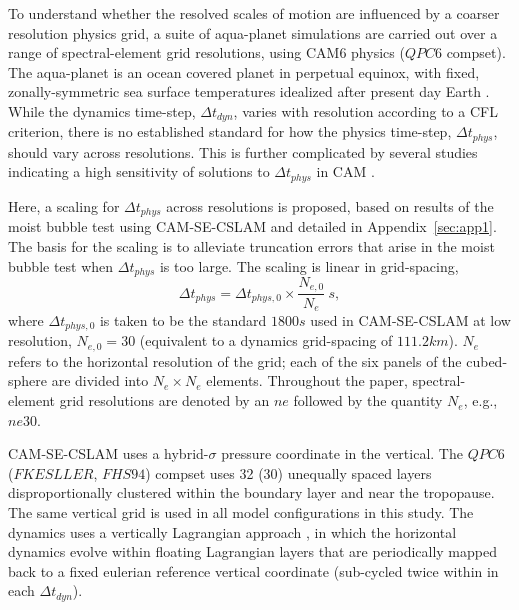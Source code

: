 \documentclass[draft,linenumbers]{agujournal}
\begin{document}
To understand whether the resolved scales of motion are influenced by a coarser resolution physics grid, a suite of aqua-planet simulations \citep{NH2000ASL,MWO2016JAMES} are carried out over a range of spectral-element grid resolutions, using CAM6 physics ($QPC6$ compset). The aqua-planet is an ocean covered planet in perpetual equinox, with fixed, zonally-symmetric sea surface temperatures idealized after present day Earth \citep[$QOBS$ in][]{NH2000ASL}. While the dynamics time-step, $\Delta t_{dyn}$, varies with resolution according to a CFL criterion, there is no established standard for how the physics time-step, $\Delta t_{phys}$, should vary across resolutions. This is further complicated by several studies indicating a high sensitivity of solutions to $\Delta t_{phys}$ in CAM  \citep{WO2003QJR,W2013QJRMS,WETAL2015JAMES,HR2018JAMES}.

Here, a scaling for $\Delta t_{phys}$ across resolutions is proposed, based on results of the moist bubble test \citep{HR2018JAMES} using CAM-SE-CSLAM and detailed in Appendix~\ref{sec:app1}. The basis for the scaling is to alleviate truncation errors that arise in the moist bubble test when $\Delta t_{phys}$ is too large. The scaling is linear in grid-spacing,
\begin{equation}
\Delta t_{phys} = \Delta t_{phys,0} \times \frac{N_{e,0}}{N_e}~s,\label{eq:dt-scale}
\end{equation}
where $\Delta t_{phys,0}$ is taken to be the standard $1800 s$ used in CAM-SE-CSLAM at low resolution, $N_{e,0} = 30$ (equivalent to a dynamics grid-spacing of $111.2km$). $N_e$ refers to the horizontal resolution of the grid; each of the six panels of the cubed-sphere are divided into $N_e \times N_e$ elements. Throughout the paper, spectral-element grid resolutions are denoted by an $ne$ followed by the quantity $N_e$, e.g., $ne30$.

CAM-SE-CSLAM uses a hybrid-$\sigma$ pressure coordinate in the vertical. The $QPC6$ ($FKESLLER$, $FHS94$) compset uses 32 (30) unequally spaced layers disproportionally clustered within the boundary layer and near the tropopause. The same vertical grid is used in all model configurations in this study. The dynamics uses a vertically Lagrangian approach \citep{L2004MWR}, in which the horizontal dynamics evolve within floating Lagrangian layers that are periodically mapped back to a fixed eulerian reference vertical coordinate (sub-cycled twice within in each $\Delta t_{dyn}$).
\end{document}
